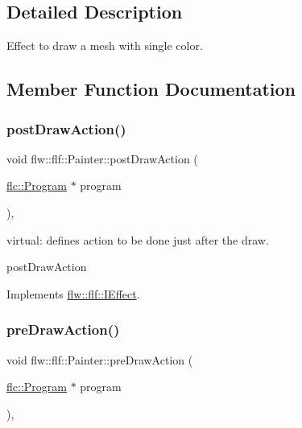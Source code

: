 \subsection{Detailed Description}
Effect to draw a mesh with single color. 

\subsection{Member Function Documentation}
\mbox{\label{classflw_1_1flf_1_1Painter_a18960e396393ce9b3fd0d8cc91fc6864}} 
\subsubsection{\texorpdfstring{post\+Draw\+Action()}{postDrawAction()}}
{\footnotesize\ttfamily void flw\+::flf\+::\+Painter\+::post\+Draw\+Action (\begin{DoxyParamCaption}\item[{\hyperlink{classflw_1_1flc_1_1Program}{flc\+::\+Program} $\ast$}]{program }\end{DoxyParamCaption})\hspace{0.3cm}{\ttfamily [override]}, {\ttfamily [virtual]}}



virtual\+: defines action to be done just after the draw. 

post\+Draw\+Action 

Implements \hyperlink{classflw_1_1flf_1_1IEffect_a6bb11d90e7e4da057ca398bd8c61208a}{flw\+::flf\+::\+I\+Effect}.

\mbox{\label{classflw_1_1flf_1_1Painter_a92e72e8875c374e4fc118cbd9e003dd5}} 
\subsubsection{\texorpdfstring{pre\+Draw\+Action()}{preDrawAction()}}
{\footnotesize\ttfamily void flw\+::flf\+::\+Painter\+::pre\+Draw\+Action (\begin{DoxyParamCaption}\item[{\hyperlink{classflw_1_1flc_1_1Program}{flc\+::\+Program} $\ast$}]{program }\end{DoxyParamCaption})\hspace{0.3cm}{\ttfamily [override]}, {\ttfamily [virtual]}}



